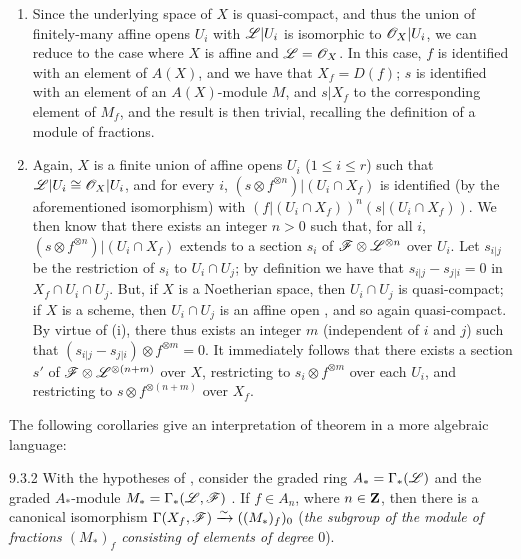 \begin{enumerate}[label=(\roman*)]
  \item Since the underlying space of $X$ is quasi-compact, and thus the union of
        finitely-many affine opens $U_i$ with $\mathscr{L}|U_i$ is isomorphic to
        $\mathscr{O}_X|U_i$, we can reduce to the case where $X$ is affine and $\mathscr{L}=\mathscr{O}_X$.
        In this case, $f$ is identified with an element of $A(X)$, and we have that
        $X_f=D(f)$; $s$ is identified with an element of an $A(X)$-module $M$, and
        $s|X_f$ to the corresponding element of $M_f$, and the result is then trivial,
        recalling the definition of a module of fractions.
  \item Again, $X$ is a finite union of affine opens $U_i$ ($1\leqslant i\leqslant r$)
        such that $\mathscr{L}|U_i\cong\mathscr{O}_X|U_i$, and for every $i$,
        $(s\otimes f^{\otimes n})|(U_i\cap X_f)$ is identified (by the aforementioned
        isomorphism) with $(f|(U_i\cap X_f))^n(s|(U_i\cap X_f))$. We then know
         that there exists an integer $n>0$ such that, for all
        $i$, $(s\otimes f^{\otimes n})|(U_i\cap X_f)$ extends to a section $s_i$ of
        $\mathscr{F}\otimes\mathscr{L}^{\otimes n}$ over $U_i$. Let $s_{i|j}$ be the restriction
        of $s_i$ to $U_i\cap U_j$; by definition we have that $s_{i|j}-s_{j|i}=0$ in
        $X_f\cap U_i\cap U_j$. But, if $X$ is a Noetherian space, then $U_i\cap U_j$ is
        quasi-compact; if $X$ is a scheme, then $U_i\cap U_j$ is an affine open
        , and so again quasi-compact. By virtue of (i), there thus
        exists an integer $m$ (independent of $i$ and $j$) such that
        $(s_{i|j}-s_{j|i})\otimes f^{\otimes m}=0$. It immediately follows that there
        exists a section $s'$ of $\mathscr{F}\otimes\mathscr{L}^{\otimes(n+m)}$ over $X$,
        restricting to $s_i\otimes f^{\otimes m}$ over each $U_i$, and restricting to
        $s\otimes f^{\otimes(n+m)}$ over $X_f$.
\end{enumerate}

The following corollaries give an interpretation of theorem  in a more
algebraic language:
\begin{envs}[Corollary]{9.3.2}
\label{cor-1.9.3.2}
With the hypotheses of , consider the graded ring $A_*=\Gamma_*(\mathscr{L})$
and the graded $A_*$-module $M_*=\Gamma_*(\mathscr{L},\mathscr{F})$ . If $f\in A_n$,
where $n\in\mathbf{Z}$, then there is a canonical isomorphism
$\Gamma(X_f,\mathscr{F})\xrightarrow{\sim}((M_*)_f)_0$ (\emph{the subgroup of the module of
fractions $(M_*)_f$ consisting of elements of degree $0$}).
\end{envs}

